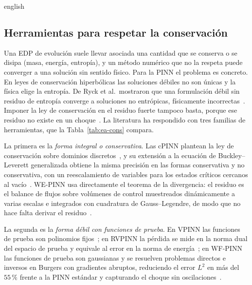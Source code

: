 \documentclass[../0000.tex]{subfiles}
\begin{document}
\begin{hyphenrules}{english}
\subsection{Herramientas para respetar la conservación}
\label{subsec:ea-cons}

Una EDP de evolución suele llevar asociada una cantidad que se conserva o se disipa (masa, energía, entropía), y un método numérico que no la respeta puede converger a una solución sin sentido físico. Para la PINN el problema es concreto. En leyes de conservación hiperbólicas las soluciones débiles no son únicas y la física elige la entropía. De Ryck et al.\ mostraron que una formulación débil sin residuo de entropía converge a soluciones no entrópicas, físicamente incorrectas~\cite{de2024wpinns}. Imponer la ley de conservación en el residuo fuerte tampoco basta, porque ese residuo no existe en un choque~\cite{chaumet2024improving}. La literatura ha respondido con tres familias de herramientas, que la Tabla~\ref{tab:ea-cons} compara.

La primera es la \emph{forma integral o conservativa}. Las cPINN plantean la ley de conservación sobre dominios discretos~\cite{jagtap2020conservative}, y su extensión a la ecuación de Buckley--Leverett generalizada obtiene la misma precisión en las formas conservativa y no conservativa, con un reescalamiento de variables para los estados críticos cercanos al vacío~\cite{quita2023conservative}. WE-PINN usa directamente el teorema de la divergencia: el residuo es el balance de flujos sobre volúmenes de control muestreados dinámicamente a varias escalas e integrados con cuadratura de Gauss--Legendre, de modo que no hace falta derivar el residuo~\cite{oubarka2026weak}.

La segunda es la \emph{forma débil con funciones de prueba}. En VPINN las funciones de prueba son polinomios fijos~\cite{kharazmi2019vpinns}; en RVPINN la pérdida se mide en la norma dual del espacio de prueba y equivale al error en la norma de energía~\cite{rojas2024robust}; en WF-PINN las funciones de prueba son gaussianas y se resuelven problemas directos e inversos en Burgers con gradientes abruptos, reduciendo el error $L^2$ en más del $55\,\%$ frente a la PINN estándar y capturando el choque sin oscilaciones~\cite{wang2025wf}.


\end{hyphenrules}
\end{document}
